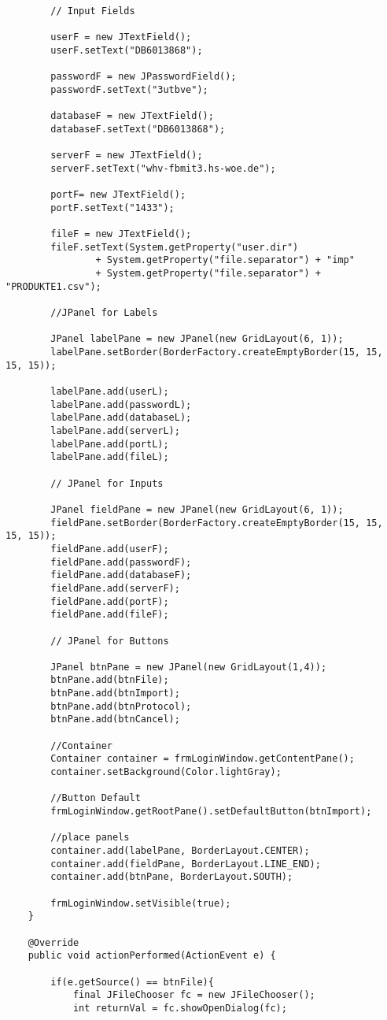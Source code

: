 \begin{lstlisting}
		// Input Fields

		userF = new JTextField();
		userF.setText("DB6013868");

		passwordF = new JPasswordField();
		passwordF.setText("3utbve");

		databaseF = new JTextField();
		databaseF.setText("DB6013868");

		serverF = new JTextField();
		serverF.setText("whv-fbmit3.hs-woe.de");

		portF= new JTextField();
		portF.setText("1433");

		fileF = new JTextField();
		fileF.setText(System.getProperty("user.dir")
				+ System.getProperty("file.separator") + "imp"
				+ System.getProperty("file.separator") + "PRODUKTE1.csv");

		//JPanel for Labels

		JPanel labelPane = new JPanel(new GridLayout(6, 1));
		labelPane.setBorder(BorderFactory.createEmptyBorder(15, 15, 15, 15));

		labelPane.add(userL);
		labelPane.add(passwordL);
		labelPane.add(databaseL);
		labelPane.add(serverL);
		labelPane.add(portL);
		labelPane.add(fileL);

		// JPanel for Inputs

		JPanel fieldPane = new JPanel(new GridLayout(6, 1));
		fieldPane.setBorder(BorderFactory.createEmptyBorder(15, 15, 15, 15));
		fieldPane.add(userF);
		fieldPane.add(passwordF);
		fieldPane.add(databaseF);
		fieldPane.add(serverF);
		fieldPane.add(portF);
		fieldPane.add(fileF);

		// JPanel for Buttons

		JPanel btnPane = new JPanel(new GridLayout(1,4));
		btnPane.add(btnFile);
		btnPane.add(btnImport);
		btnPane.add(btnProtocol);
		btnPane.add(btnCancel);

		//Container
		Container container = frmLoginWindow.getContentPane();
		container.setBackground(Color.lightGray);

		//Button Default
		frmLoginWindow.getRootPane().setDefaultButton(btnImport);

		//place panels
		container.add(labelPane, BorderLayout.CENTER);
		container.add(fieldPane, BorderLayout.LINE_END);
		container.add(btnPane, BorderLayout.SOUTH);

		frmLoginWindow.setVisible(true);
	}

	@Override
	public void actionPerformed(ActionEvent e) {

		if(e.getSource() == btnFile){
			final JFileChooser fc = new JFileChooser();
			int returnVal = fc.showOpenDialog(fc);


\end{lstlisting}
